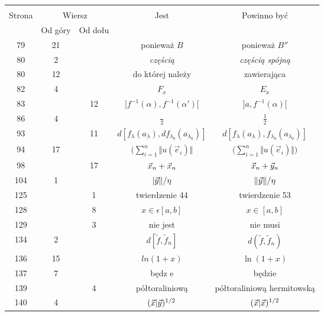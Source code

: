 \documentclass[a4paper,11pt]{article}
\begin{document}
\begin{center}

  \begin{tabular}{|c|c|c|c|c|}
    \hline
    & \multicolumn{2}{c|}{} & & \\
    Strona & \multicolumn{2}{c|}{Wiersz} & Jest
                              & Powinno być \\ \cline{2-3}
    & Od góry & Od dołu & & \\
    \hline
    79  & 21 & & ponieważ $B$ & ponieważ $B''$ \\
    80  &  2 & & \emph{częścią} & \emph{częścią spójną} \\
    80  & 12 & & do której należy & zawierająca \\
    82  &  4 & & $F_{ x }$ & $E_{ x }$ \\
    83  & & 12 & $] f^{ - 1 }( \alpha ), f^{ -1 }( \alpha' ) [$
           & $] a, f^{ -1 }( \alpha ) [$ \\
    86  &  4 & & $\frac{ {} }{ 2 }$ & $\frac{ 1 }{ 2 }$ \\
    93  & & 11 & $d[ f_{ \lambda }( a_{ \lambda } ), df_{ \lambda_{ 0 } }( a_{ \lambda_{ 0 } } ) ]$
           & $d[ f_{ \lambda }( a_{ \lambda } ), f_{ \lambda_{ 0 } }( a_{ \lambda_{ 0 } } ) ]$ \\
    94  & 17 & & $\big( \sum_{ i = 1 }^{ n } \Vert u( \vec{ e }_{ i } ) \Vert$
           & $\big( \sum_{ i = 1 }^{ n } \Vert u( \vec{ e }_{ i } ) \Vert \big)$ \\
    98  & & 17 & $\vec{ x }_{ n } + \vec{ x }_{ n }$
           & $\vec{ x }_{ n } + \vec{ y }_{ n }$ \\
    104 &  1 & & $| \vec{ y } \Vert / \eta$ & $\Vert \vec{ y } \Vert / \eta$ \\
    125 & &  1 & twierdzenie 44 & twierdzenie 53 \\
    128 & &  8 & $x \in \epsilon [ a, b ]$ & $x \in [ a, b ]$ \\
    129 & &  3 & nie jest & nie musi \\
    134 &  2 & & $d[ \tilde{ f }, \tilde{ f }_{ n } ]$
           & $d( \tilde{ f }, \tilde{ f }_{ n } )$ \\
    136 & 15 & & $ln( 1 + x )$ & $\ln( 1 + x )$ \\
    137 &  7 & & będz e & będzie \\
    139 & &  4 & półtoraliniową & półtoraliniową hermitowską \\
    140 &  4 & & $( \vec{ x } | \vec{ y } )^{ 1 / 2 }$
           & $( \vec{ x } | \vec{ x } )^{ 1 / 2 }$ \\

\end{tabular}
\end{center}
\end{document}
